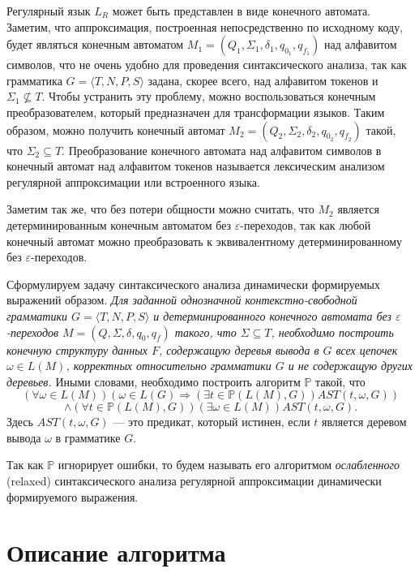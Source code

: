 Регулярный язык $L_R$ может быть представлен в виде конечного автомата. Заметим, что аппроксимация, построенная непосредственно по исходному коду, будет являться конечным автоматом $M_1=(Q_1,\Sigma_1,\delta_1,q_{0_1},q_{f_1})$ над алфавитом символов, что не очень удобно для проведения синтаксического анализа, так как грамматика $G = \langle T, N, P, S \rangle$ задана, скорее всего, над алфавитом токенов и $\Sigma_1 \nsubseteq T$. Чтобы устранить эту проблему, можно воспользоваться конечным преобразователем, который предназначен для трансформации языков. Таким образом, можно получить конечный автомат $M_2=(Q_2,\Sigma_2,\delta_2,q_{0_2},q_{f_2})$ такой, что $\Sigma_2 \subseteq T$. Преобразование конечного автомата над алфавитом символов в конечный автомат над алфавитом токенов называется лексическим анализом регулярной аппроксимации или встроенного языка.

Заметим так же, что без потери общности можно считать, что $M_2$ является детерминированным конечным автоматом без $\varepsilon$-переходов, так как любой конечный автомат можно преобразовать к эквивалентному детерминированному без  $\varepsilon$-переходов.

Сформулируем задачу синтаксического анализа динамически формируемых выражений образом. \textit{ Для заданной однозначной контекстно-свободной грамматики $G = \langle T, N, P, S \rangle$ и детерминированного конечного автомата без $\varepsilon$-переходов $M=(Q,\Sigma,\delta,q_0,q_f)$ такого, что $\Sigma \subseteq T$, необходимо построить конечную структуру данных $F$, содержащую деревья вывода в $G$ всех цепочек $\omega \in L(M)$, корректных относительно грамматики $G$ и не содержащую других деревьев. } Иными словами, необходимо построить алгоритм $\mathbb{P}$ такой, что
    $$(\forall \omega \in L(M)) (\omega \in L(G) \Rightarrow (\exists t \in \mathbb{P}(L(M),G))AST(t, \omega, G))$$
    $$\land (\forall t \in \mathbb{P}(L(M),G))(\exists \omega \in L(M))AST(t,\omega,G).$$ 
    Здесь $AST(t,\omega,G)$ --- это предикат, который истинен, если $t$ является деревом вывода $\omega$ в грамматике $G$.


Так как $\mathbb{P}$ игнорирует ошибки, то будем называть его алгоритмом \textit{ослабленного} (relaxed) синтаксического анализа регулярной аппроксимации динамически формируемого выражения.


\section{Описание алгоритма}\label{AlgoDescr}

